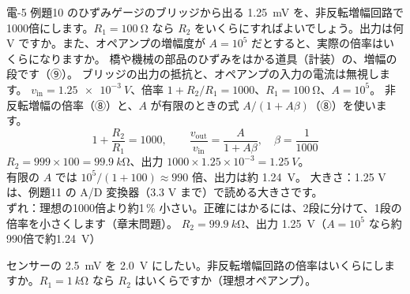 \label{ph:原-10:ex8}
\begin{phreidai}[ひずみゲージの信号を増幅する]
電-5 例題10 のひずみゲージのブリッジから出る \qty{1.25}{mV} を、非反転増幅回路で1000倍にします。$R_1=\qty{100}{\ohm}$ なら $R_2$ をいくらにすればよいでしょう。出力は何 V ですか。また、オペアンプの増幅度が $A=10^5$ だとすると、実際の倍率はいくらになりますか。
\phbamen
橋や機械の部品のひずみをはかる道具（計装）の、増幅の段です（⑨）。
\phmushi
ブリッジの出力の抵抗と、オペアンプの入力の電流は無視します。
\phzu
$v_{\mathrm{in}}=\qty{1.25e-3}{V}$、倍率 $1+R_2/R_1=1000$、$R_1=\qty{100}{\ohm}$、$A=10^5$。
\phriyu
非反転増幅の倍率（⑧）と、$A$ が有限のときの式 $A/(1+A\beta)$（⑧）を使います。
\phtateru
\[ 1+\frac{R_2}{R_1}=1000,\qquad \frac{v_{\mathrm{out}}}{v_{\mathrm{in}}}=\frac{A}{1+A\beta},\quad \beta=\frac1{1000} \]
\phtoku
$R_2=999\times100=\qty{99.9}{k\ohm}$、出力 $1000\times1.25\times10^{-3}=\qty{1.25}{V}$。\\
有限の $A$ では $10^5/(1+100)\approx990$ 倍、出力は約 \qty{1.24}{V}。
\phtashikame
大きさ：1.25 V は、例題11 の A/D 変換器（3.3 V まで）で読める大きさです。\\
ずれ：理想の1000倍より約1\,\% 小さい。正確にはかるには、2段に分けて、1段の倍率を小さくします（章末問題）。
\kotae $R_2=\qty{99.9}{k\ohm}$、出力 \qty{1.25}{V}（$A=10^5$ なら約990倍で約\qty{1.24}{V}）
\end{phreidai}
\begin{jibun}
センサーの \qty{2.5}{mV} を \qty{2.0}{V} にしたい。非反転増幅回路の倍率はいくらにしますか。$R_1=\qty{1}{k\ohm}$ なら $R_2$ はいくらですか（理想オペアンプ）。
\end{jibun}

